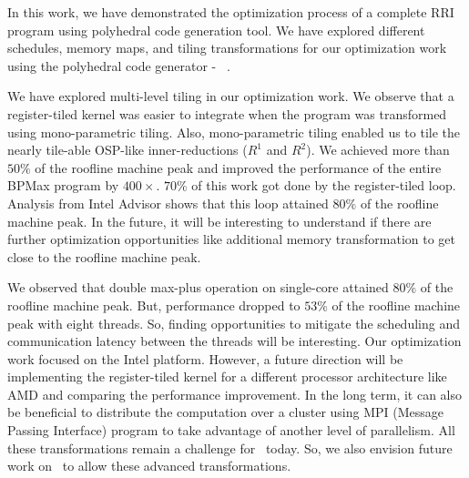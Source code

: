 In this work, we have demonstrated the optimization process of a complete RRI program using polyhedral code generation tool. We have explored different schedules, memory maps, and tiling transformations for our optimization work using the polyhedral code generator -  \alphaz\ .

We have explored multi-level tiling in our optimization work. We observe that a register-tiled kernel was easier to integrate when the program was transformed using mono-parametric tiling. Also, mono-parametric tiling enabled us to tile the nearly tile-able OSP-like inner-reductions ($R^{1}$ and $R^{2}$). We achieved more than $50\%$ of the roofline machine peak and improved the performance of the entire BPMax program by $400\times$. $70\%$ of this work got done by the register-tiled loop. Analysis from Intel Advisor shows that this loop attained $80\%$ of the roofline machine peak. In the future, it will be interesting to understand if there are further optimization opportunities like additional memory transformation to get close to the roofline machine peak.

We observed that double max-plus operation on single-core attained $80\%$ of the roofline machine peak. But, performance dropped to $53\%$ of the roofline machine peak with eight threads. So, finding opportunities to mitigate the scheduling and communication latency between the threads will be interesting. Our optimization work focused on the Intel platform. However, a future direction will be implementing the register-tiled kernel for a different processor architecture like AMD and comparing the performance improvement. In the long term, it can also be beneficial to distribute the computation over a cluster using MPI (Message Passing Interface) program to take advantage of another level of parallelism. All these transformations remain a challenge for \alphaz\ today. So, we also envision future work on \alphaz\ to allow these advanced transformations.


